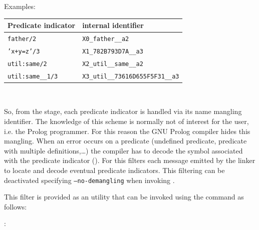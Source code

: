 Examples: 

\begin{center}
\begin{tabular}{l|l}

Predicate indicator   & internal identifier \\
\hline
\texttt{father/2}     & \texttt{X0\_father\_\_a2} \\
\texttt{'x+y=z'/3}    & \texttt{X1\_782B793D7A\_\_a3} \\
\texttt{util:same/2}  & \texttt{X2\_util\_\_same\_\_a2} \\
\texttt{util:same\_\_1/3} & \texttt{X3\_util\_\_73616D655F5F31\_\_a3} \\

\end{tabular}
\end{center}

~\BL

So, from the  stage, each predicate indicator is handled
via its name mangling identifier. The knowledge of this scheme is normally
not of interest for the user, i.e. the Prolog programmer. For this reason the
GNU Prolog compiler hides this mangling. When an error occurs on a predicate
(undefined predicate, predicate with multiple definitions,\ldots) the
compiler has to decode the symbol associated with the predicate indicator
(). For this  filters each message emitted
by the linker to locate and decode eventual predicate indicators. This
filtering can be deactivated specifying \texttt{--no-demangling} when
invoking  .

This filter is provided as an utility that can be invoked using the
 command as follows:


:

